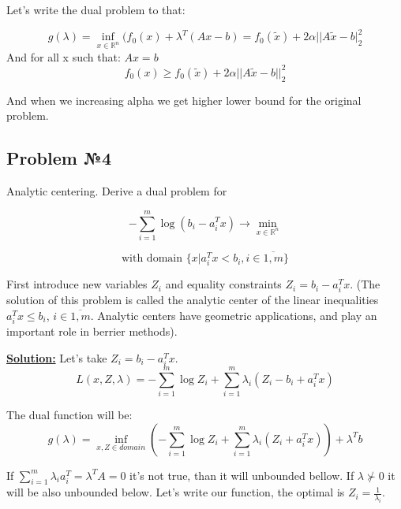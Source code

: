 Let's write the dual problem to that:

\begin{equation*}
    g(\lambda) = \inf_{x \in \mathds{R}^n} (f_0(x) + \lambda^T(Ax - b) = f_0(\widetilde{x}) + 2\alpha ||A\widetilde{x} - b|_2^2
\end{equation*}
And for all x such that: $Ax = b$
\begin{equation*}
    f_0(x) \geq f_0(\widetilde{x}) + 2\alpha ||A\widetilde{x} - b||_2^2
\end{equation*}

And when we increasing alpha we get higher lower bound for the original problem.

\subsection{Problem №4}
Analytic centering. Derive a dual problem for

\begin{equation*}
- \sum\limits_{i=1}^m \log (b_i - a_i^Tx) \rightarrow \min_{x \in \mathds{R}^n}
\end{equation*}

\begin{equation*}
    \text{with domain } \{x | a_i^T x < b_i, i \in \overline{1, m} \}
\end{equation*}

First introduce new variables $Z_i$ and equality constraints $Z_i = b_i - a_i^Tx$. (The solution of this problem is called the analytic center of the linear inequalities $a_i^Tx \leq b_i$, $i \in \overline{1, m}$. Analytic centers have geometric applications, and play an important role in berrier methods).

\underline{\textbf{Solution:}}
Let's take $Z_i = b_i - a_i^Tx$.
\begin{equation*}
    L(x, Z, \lambda) = - \sum\limits_{i=1}^m \log Z_i + \sum\limits_{i=1}^m\lambda_i(Z_i - b_i + a_i^Tx)
\end{equation*}

The dual function will be:
\begin{equation*}
    g(\lambda) = \inf_{x, Z \in domain} ( - \sum\limits_{i=1}^m \log Z_i + \sum\limits_{i=1}^m\lambda_i(Z_i + a_i^Tx)) + \lambda^Tb
\end{equation*}

If $\sum\limits_{i=1}^m \lambda_i a_i^T = \lambda^TA = 0$ it's not true, than it will unbounded bellow. If $\lambda \not \succ 0$ it will be also unbounded below. Let's write our function, the optimal is $Z_i = \frac{1}{\lambda_i}$.

